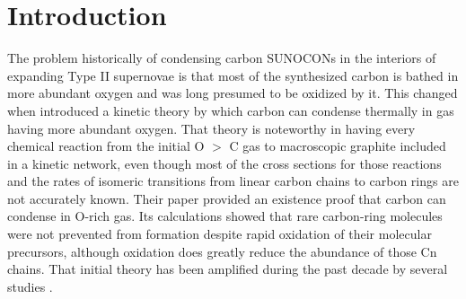 \documentclass[manuscript]{aastex}
\begin{document}


\section{Introduction}

The problem historically of condensing carbon SUNOCONs in the interiors of
expanding Type II supernovae is that most of the synthesized carbon is bathed
in more abundant oxygen and was long presumed to be oxidized by it. This
changed when \citet{1999Sci...283.1290C} introduced a kinetic theory by
which carbon can condense thermally in gas having more abundant oxygen.
That theory is noteworthy in having every chemical reaction from the initial
O $>$ C gas to macroscopic graphite included in a kinetic network, even though
most of the cross sections for those reactions and the rates of isomeric
transitions from linear carbon chains to carbon rings are not accurately known.
Their paper provided an existence proof that carbon can condense in O-rich gas.
Its calculations showed that rare carbon-ring molecules were not prevented from
formation despite rapid oxidation of their molecular precursors, although
oxidation does greatly reduce the abundance of those Cn chains. That initial
theory has been amplified during the past decade by several studies
\citep{2001ApJ...562..480C,2003ApJ...594..312D,2006ApJ...638..234D,
2009ApJ...703..642C,2010ApJ...713....1C,2011NewAR..55..155C,
2013ApJ...762....5C}.
\end{document}
